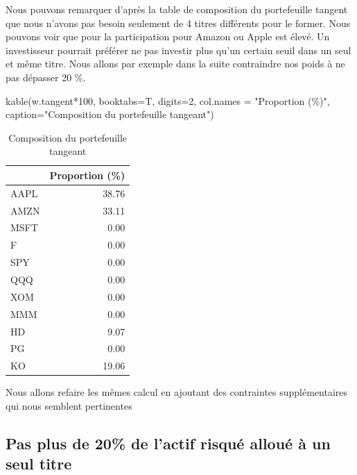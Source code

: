 \documentclass[
]{article}
\newenvironment{Shaded}{\begin{snugshade}}{\end{snugshade}}
\newcommand{\AttributeTok}[1]{\textcolor[rgb]{0.77,0.63,0.00}{#1}}
\newcommand{\DecValTok}[1]{\textcolor[rgb]{0.00,0.00,0.81}{#1}}
\newcommand{\FunctionTok}[1]{\textcolor[rgb]{0.00,0.00,0.00}{#1}}
\newcommand{\NormalTok}[1]{#1}
\newcommand{\SpecialCharTok}[1]{\textcolor[rgb]{0.00,0.00,0.00}{#1}}
\newcommand{\StringTok}[1]{\textcolor[rgb]{0.31,0.60,0.02}{#1}}
\begin{document}
Nous pouvons remarquer d'après la table de composition du portefeuille
tangent que nous n'avons pas besoin seulement de 4 titres différents
pour le former. Nous pouvons voir que pour la participation pour Amazon
ou Apple est élevé. Un investisseur pourrait préférer ne pas investir
plus qu'un certain seuil dans un seul et même titre. Nous allons par
exemple dans la suite contraindre nos poids à ne pas dépasser 20 \%.

\begin{Shaded}
\begin{Highlighting}[]
\FunctionTok{kable}\NormalTok{(w.tangent}\SpecialCharTok{*}\DecValTok{100}\NormalTok{, }\AttributeTok{booktabs=}\NormalTok{T, }\AttributeTok{digits=}\DecValTok{2}\NormalTok{, }\AttributeTok{col.names =} \StringTok{"Proportion (\%)"}\NormalTok{,}
      \AttributeTok{caption=}\StringTok{"Composition du portefeuille tangeant"}\NormalTok{)}
\end{Highlighting}
\end{Shaded}

\begin{table}

\caption{\label{tab:unnamed-chunk-10}Composition du portefeuille tangeant}
\centering
\begin{tabular}[t]{lr}
\toprule
  & Proportion (\%)\\
\midrule
AAPL & 38.76\\
AMZN & 33.11\\
MSFT & 0.00\\
F & 0.00\\
SPY & 0.00\\
\addlinespace
QQQ & 0.00\\
XOM & 0.00\\
MMM & 0.00\\
HD & 9.07\\
PG & 0.00\\
\addlinespace
KO & 19.06\\
\bottomrule
\end{tabular}
\end{table}

Nous allons refaire les mêmes calcul en ajoutant des contraintes
supplémentaires qui nous semblent pertinentes

\hypertarget{pas-plus-de-20-de-lactif-risquuxe9-allouuxe9-uxe0-un-seul-titre}{%
\subsection{Pas plus de 20\% de l'actif risqué alloué à un seul
titre}\label{pas-plus-de-20-de-lactif-risquuxe9-allouuxe9-uxe0-un-seul-titre}}
\end{document}
